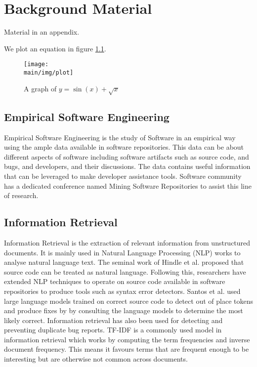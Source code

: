 \documentclass[\main/thesis.tex]{subfiles}
\begin{document}
\chapter{Background Material}

Material in an appendix.

We plot an equation in figure \ref{fig:plot}.

\begin{figure}
    \centering
    \texttt{[image: \\main/img/plot]}
    \caption[A supporting figure] {A graph of $y = \sin(x) + \sqrt{x}$}
    \label{fig:plot}
\end{figure}


\section{Empirical Software Engineering}
Empirical Software Engineering is the study of Software in an empirical way using the ample data available in software repositories. This data can be about different aspects of software including software artifacts such as source code, and bugs, and developers, and their discussions. The data contains useful information that can be leveraged to make developer assistance tools. Software community has a dedicated conference named Mining Software Repositories to assist this line of research. 
\section{Information Retrieval}
Information Retrieval is the extraction of relevant information from unstructured documents. It is mainly used in Natural Language Processing (NLP) works to analyse natural language text. The seminal work of Hindle et al. proposed that source code can be treated as natural language. Following this, researchers have extended NLP techniques to operate on source code available in software repositories to produce tools such as syntax error detectors. Santos et al. used large language models trained on correct source code to detect out of place tokens and produce fixes by by consulting the language models to determine the most likely correct. Information retrieval has also been used for detecting and preventing duplicate bug reports. TF-IDF is a commonly used model in information retrieval which works by computing the term frequencies and inverse document frequency. This means it favours terms that are frequent enough to be interesting but are otherwise not common across documents.
\end{document}
